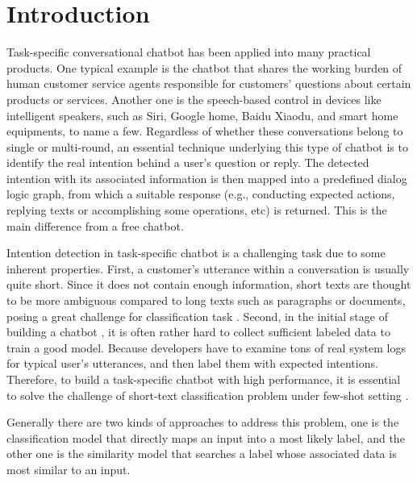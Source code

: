 \section{Introduction}
\label{sec:intro}

Task-specific  conversational  chatbot  \cite{wen2016network}  has been applied
into  many practical products. One typical example is the chatbot that shares the working burden of
human  customer  service  agents  responsible  for  customers' questions about
certain  products  or services. Another one is the speech-based control in
devices  like  intelligent  speakers, such as Siri, Google home, Baidu Xiaodu,
and smart home equipments, to name a few. Regardless of whether these conversations belong to
single or  multi-round, an essential technique underlying this type of chatbot is to
identify  the  real  intention  behind  a  user's  question or reply. 
The detected intention  with  its  associated  information  is then mapped into a
predefined dialog logic graph, from which a suitable response (e.g., conducting 
expected actions, replying texts or accomplishing some operations, etc)  is returned.
This  is  the  main  difference  from  a  free chatbot.  

Intention detection in task-specific chatbot  is  a  challenging task due to some inherent properties. First,
a customer's  utterance  within  a conversation is usually quite short. Since it
does  not  contain  enough  information,  short  texts \cite{song2014short} are
thought  to  be  more  ambiguous  compared to long texts such as paragraphs or
documents,  posing  a  great challenge \cite{chen2019deep} for classification
task   \cite{phan2008learning,yan2009dynamic,hua2015short}.   Second,  in  the
initial  stage  of  building  a  chatbot  , it is often rather hard to collect
sufficient  labeled  data  to  train  a good model. Because developers have to
examine tons of real system logs for typical user's utterances, and then label
them  with expected intentions. Therefore, to build a task-specific chatbot with
high  performance, it is essential to solve the challenge of short-text
classification   \cite{sriram2010short}   problem   under   few-shot   setting
\cite{yu2018diverse}.


Generally  there  are  two  kinds  of  approaches  to  address  this  problem,
one is the classification model that directly maps an input into a most likely label, and
the other one is the similarity  model  that searches a label whose associated data is most similar to
an input.


